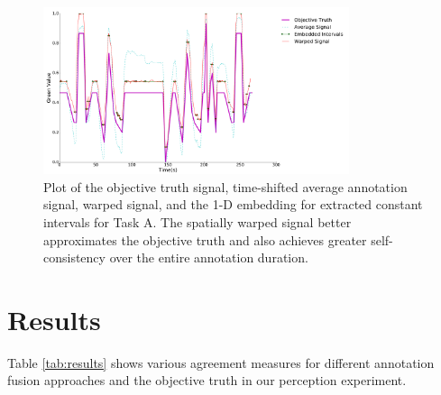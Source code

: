 \documentclass[times,twocolumn,final,authoryear]{elsarticle}
\begin{document}
\begin{figure}
	\centering
	\includegraphics[width=0.8\textwidth]{images/warp_evaldep}
	\caption{Plot of the objective truth signal, time-shifted average annotation signal, warped signal, and the 1-D embedding for extracted constant intervals for Task A.  The spatially warped signal better approximates the objective truth and also achieves greater self-consistency over the entire annotation duration.}
	\label{fig:warp_evaldep}
\end{figure}

\section{Results}
Table \ref{tab:results} shows various agreement measures for different annotation fusion approaches and the objective truth in our perception experiment.
\end{document}
